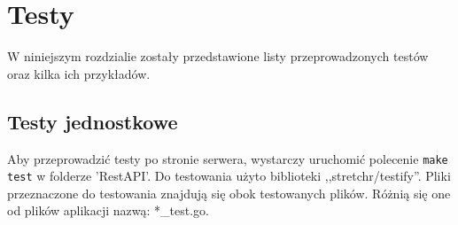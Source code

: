 \chapter{Testy}
\label{ch:Testy}
W niniejszym rozdzialie zostały przedstawione listy przeprowadzonych testów oraz kilka ich przykładów.
\section{Testy jednostkowe}
Aby przeprowadzić testy po stronie serwera, wystarczy uruchomić polecenie \texttt{make test} w folderze 'RestAPI'.
Do testowania użyto biblioteki ,,stretchr/testify''.
Pliki przeznaczone do testowania znajdują się obok testowanych plików. Różnią się one od plików aplikacji nazwą: *\_test.go.

